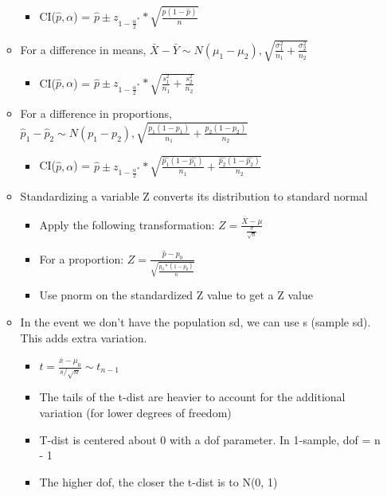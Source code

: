 \documentclass[8pt,landscape,a4paper, fleqn, dvipsnames]{extarticle}
\begin{document}
\begin{multicols*}{4}
\begin{itemize}
\begin{itemize}
    \begin{itemize}
        \item CI($\hat{p}, \alpha$) = $\hat{p} \pm z_{1 - \frac{\alpha}{2}^{*}} * \sqrt{\frac{\hat{p}(1 - \hat{p})}{n}}$
    \end{itemize}
    \item For a difference in means, $\bar{X} - \bar{Y} \sim N(\mu_1 - \mu_2), \sqrt{\frac{\sigma_1^2}{n_1} + \frac{\sigma_2^2}{n_2}}$
    \begin{itemize}
        \item CI($\hat{p}, \alpha$) = $\hat{p} \pm z_{1 - \frac{\alpha}{2}^{*}} * \sqrt{\frac{s_1^2}{n_1} + \frac{s_2^2}{n_2}}$
    \end{itemize}
    \item For a difference in proportions, $\hat{p}_1 - \hat{p}_2 \sim N(p_1 - p_2), \sqrt{\frac{p_1(1 - p_1)}{n_1} + \frac{p_2(1 - p_2)}{n_2}}$
    \begin{itemize}
        \item CI($\hat{p}, \alpha$) = $\hat{p} \pm z_{1 - \frac{\alpha}{2}^{*}} * \sqrt{\frac{\hat{p_1}(1 - \hat{p_1})}{n_1} + \frac{\hat{p_2}(1 - \hat{p_2})}{n_2}}$
    \end{itemize}
    \item Standardizing a variable Z converts its distribution to standard normal
    \begin{itemize}
        \item Apply the following transformation: $Z = \frac{\bar{X} - \mu}{\frac{\sigma}{\sqrt{n}}}$
        \item For a proportion: $Z = \frac{\hat{p} - p_0}{\sqrt{\frac{p_0*(1 - p_0)}{n}}}$
        \item Use pnorm on the standardized Z value to get a Z value 
    \end{itemize}
    \item In the event we don't have the population sd, we can use s (sample sd). This adds extra variation.
    \begin{itemize}
        \item $t = \frac{\bar{x} - \mu_0}{s / \sqrt{n}} \sim t_{n - 1}$
        \item The tails of the t-dist are heavier to account for the additional variation (for lower degrees of freedom)
        \item T-dist is centered about 0 with a dof parameter. In 1-sample, dof = n - 1
        \item The higher dof, the closer the t-dist is to N(0, 1)
    \end{itemize}

\end{itemize}
\end{itemize}
\end{multicols*}
\end{document}
